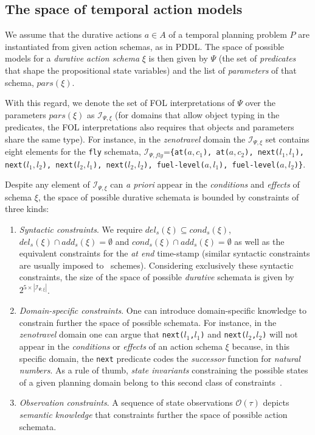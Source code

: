 \documentclass[runningheads]{llncs}
\begin{document}
\subsection{The space of temporal action models}
We assume that the durative actions $a\in A$ of a temporal planning problem $P$ are instantiated from given action schemas, as in PDDL. The space of possible models for a {\em durative action schema} $\xi$ is then given by $\Psi$ (the set of {\em predicates} that shape the propositional state variables) and the list of {\em parameters} of that schema, $pars(\xi)$.

With this regard, we denote the set of FOL interpretations of $\Psi$ over the parameters $pars(\xi)$ as ${\mathcal I}_{\Psi,\xi}$ (for domains that allow object typing in the predicates, the FOL interpretations also requires that objects and parameters share the same type). For instance, in the {\em zenotravel} domain the ${\mathcal I}_{\Psi,\xi}$ set contains eight elements for the {\small\tt fly} schemata, ${\mathcal I}_{\Psi,fly}$={\small\tt\{at($a,c_1$), at($a,c_2$), next($l_1,l_1$), next($l_1,l_2$), next($l_2,l_1$), next($l_2,l_2$), fuel-level($a,l_1$), fuel-level($a,l_2$)\}}.

Despite any element of ${\mathcal I}_{\Psi,\xi}$ can {\em a priori} appear in the {\em conditions} and {\em effects} of schema $\xi$, the space of possible durative schemata is bounded by constraints of three kinds:
\begin{enumerate}
\item {\em Syntactic constraints}. We require $del_s(\xi)\subseteq cond_s(\xi)$, $del_s(\xi)\cap add_s(\xi)=\emptyset$ and $cond_s(\xi)\cap add_s(\xi)=\emptyset$ as well as the equivalent constraints for the {\em at end} time-stamp (similar syntactic constraints are usually imposed to \strips\ schemes). Considering exclusively these syntactic constraints, the size of the space of possible {\em durative} schemata is given by $2^{5\times|{\mathcal I}_{\Psi,\xi}|}$.
\item {\em Domain-specific constraints}. One can introduce domain-specific knowledge to constrain further the space of possible schemata. For instance, in the {\em zenotravel} domain one can argue that {\small\tt next($l_1$,$l_1$)} and {\small\tt next($l_2$,$l_2$)} will not appear in the {\em conditions} or {\em effects} of an action schema $\xi$ because, in this specific domain, the {\tt\small next} predicate codes the {\em successor} function for {\em natural numbers}. As a rule of thumb, {\it state invariants} constraining the possible states of a given planning domain belong to this second class of constraints~\cite{fox:TIM:JAIR1998}.

\item {\em Observation constraints}. A sequence of state observations $\mathcal{O}(\tau)$ depicts {\em semantic knowledge} that constraints further the space of possible action schemata.
\end{enumerate}
\end{document}
